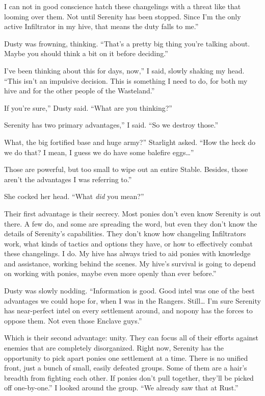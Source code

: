 \leavevmode{}I can not in good conscience hatch these changelings with a threat like that looming over them. Not until Serenity has been stopped. Since I’m the only active Infiltrator in my hive, that means the duty falls to me.”

Dusty was frowning, thinking. “That’s a pretty big thing you’re talking about. Maybe you should think a bit on it before deciding.”

\leavevmode{}I’ve been thinking about this for days, now,” I said, slowly shaking my head. “This isn’t an impulsive decision. This is something I need to do, for both my hive and for the other people of the Wasteland.”

\leavevmode{}If you’re sure,” Dusty said. “What are you thinking?”

\leavevmode{}Serenity has two primary advantages,” I said. “So we destroy those.”

\leavevmode{}What, the big fortified base and huge army?” Starlight asked. “How the heck do we do that? I mean, I guess we do have some balefire eggs…”

\leavevmode{}Those are powerful, but too small to wipe out an entire Stable. Besides, those aren’t the advantages I was referring to.”

She cocked her head. “What \textit{did} you mean?”

\leavevmode{}Their first advantage is their secrecy. Most ponies don’t even know Serenity is out there. A few do, and some are spreading the word, but even they don’t know the details of Serenity’s capabilities. They don’t know how changeling Infiltrators work, what kinds of tactics and options they have, or how to effectively combat these changelings. I do. My hive has always tried to aid ponies with knowledge and assistance, working behind the scenes. My hive’s survival is going to depend on working with ponies, maybe even more openly than ever before.”

Dusty was slowly nodding. “Information is good. Good intel was one of the best advantages we could hope for, when I was in the Rangers. Still… I’m sure Serenity has near-perfect intel on every settlement around, and nopony has the forces to oppose them. Not even those Enclave guys.”

\leavevmode{}Which is their second advantage: unity. They can focus all of their efforts against enemies that are completely disorganized. Right now, Serenity has the opportunity to pick apart ponies one settlement at a time. There is no unified front, just a bunch of small, easily defeated groups. Some of them are a hair’s breadth from fighting each other. If ponies don’t pull together, they’ll be picked off one-by-one.” I looked around the group. “We already saw that at Rust.”


